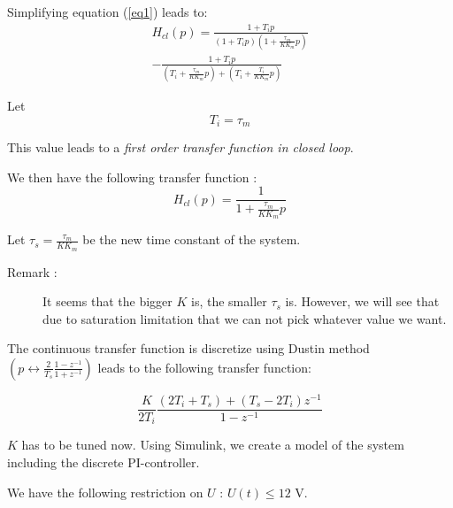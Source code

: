 Simplifying equation (\ref{eq1}) leads to: 
\begin{multline} \label{contTransfertPI} H_{cl}(p) = \frac{1 + T_i p}{(1+T_i p)(1+\frac{\tau_{m}}{K K_m} p)} \\ - \frac{1 + T_i p}{(T_i + \frac{\tau_m}{K K_m}p) + (T_i + \frac{T_i}{K K_m}p)} \end{multline}

Let \begin{equation} \label{valueTi} T_i = \tau_m \end{equation}

This value leads to a \emph{first order transfer function in closed loop}.

We then have the following transfer function : \begin{equation} H_{cl}(p) = \frac{1}{1 + \frac{\tau_m}{K K_m}p} \end{equation}

Let $\tau_{s} = \frac{\tau_m}{K K_m}$ be the new time constant of the system.

\begin{description} \item[Remark :] It seems that the bigger $K$ is, the smaller $\tau_{s}$ is. 
  However, we will see that due to saturation limitation that we can not pick whatever value we want. \end{description}

The continuous transfer function is discretize using Dustin method $\left(p \leftrightarrow \frac{2}{T_s} \frac{1-z^{-1}}{1 + z^{-1}}\right)$ leads to the following transfer function:

\begin{equation} \label{disTransferPI} \frac{K}{2 T_i} \frac{(2 T_i + T_s) + (T_s - 2 T_i) z^{-1} }{ 1 - z^{-1} } \end{equation}

$K$ has to be tuned now. Using Simulink, we create a model of the system including the discrete PI-controller. 

We have the following restriction on $U$ : $U(t) \leq 12 \text{ V}$.

